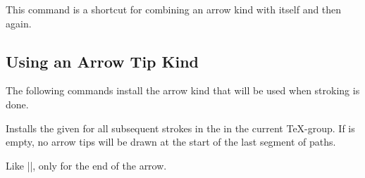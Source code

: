 \begin{command}{\pgfarrowsdeclaretriple{}}
  This command is a shortcut for combining an arrow kind with itself
  and then again.

\begin{codeexample}[]
%
\end{codeexample} 
\end{command}





\subsection{Using an Arrow Tip Kind}

The following commands install the arrow kind that will be used when
stroking is done.

\begin{command}{\pgfsetarrowsstart{}}
  Installs the given  for all subsequent
  strokes in the in the current \TeX-group. If 
  is empty, no arrow tips will be drawn at the start of the last
  segment of paths.
\begin{codeexample}[]
\end{codeexample} 
\end{command}

\begin{command}{\pgfsetarrowsend{}}
  Like |\pgfsetarrowsstart|, only for the end of the arrow.
\begin{codeexample}[]
\end{codeexample} 
\end{command}

